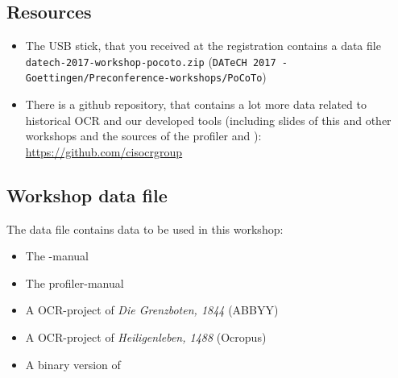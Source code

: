 \subsection{Resources}
\begin{frame}
	\begin{itemize}
		\item The USB stick, that you received at the registration contains a data
			file \texttt{datech-2017-workshop-pocoto.zip} (\texttt{DATeCH 2017 -
			Goettingen/Preconference-workshops/PoCoTo})
		\item There is a github repository, that contains a lot more data related to
			historical OCR and our developed tools (including slides of this and other
			workshops and the sources of the profiler and \pocoto{}):
			\href{https://github.com/cisocrgroup}{\url{https://github.com/cisocrgroup}}
	\end{itemize}
\end{frame}

\subsection{Workshop data file}
\begin{frame}
	The data file contains data to be used in this workshop:
	\begin{itemize}
		\item The \pocoto{}-manual
		\item The profiler-manual
		\item A OCR-project of \emph{Die Grenzboten, 1844} (ABBYY)
		\item A OCR-project of \emph{Heiligenleben, 1488} (Ocropus)
		\item A binary version of \pocoto{}
	\end{itemize}
\end{frame}

\section{}
\subsection{}
\begin{frame}
\end{frame}


